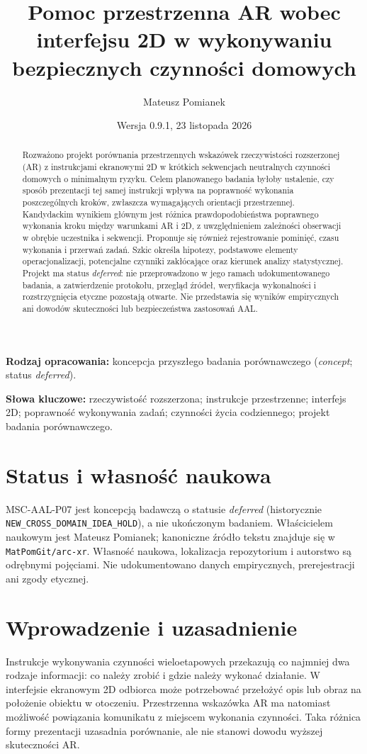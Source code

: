 \documentclass[11pt,a4paper]{article}
\title{Pomoc przestrzenna AR wobec interfejsu 2D w wykonywaniu bezpiecznych czynności domowych}
\author{Mateusz Pomianek}
\date{Wersja 0.9.1, 23 listopada 2026}
\begin{document}
\maketitle

\noindent\textbf{Rodzaj opracowania:} koncepcja przyszłego badania porównawczego (\textit{concept}; status \textit{deferred}).

\begin{abstract}
Rozważono projekt porównania przestrzennych wskazówek rzeczywistości rozszerzonej (AR) z instrukcjami ekranowymi 2D w krótkich sekwencjach neutralnych czynności domowych o minimalnym ryzyku. Celem planowanego badania byłoby ustalenie, czy sposób prezentacji tej samej instrukcji wpływa na poprawność wykonania poszczególnych kroków, zwłaszcza wymagających orientacji przestrzennej. Kandydackim wynikiem głównym jest różnica prawdopodobieństwa poprawnego wykonania kroku między warunkami AR i 2D, z uwzględnieniem zależności obserwacji w obrębie uczestnika i sekwencji. Proponuje się również rejestrowanie pominięć, czasu wykonania i przerwań zadań. Szkic określa hipotezy, podstawowe elementy operacjonalizacji, potencjalne czynniki zakłócające oraz kierunek analizy statystycznej. Projekt ma status \textit{deferred}: nie przeprowadzono w jego ramach udokumentowanego badania, a zatwierdzenie protokołu, przegląd źródeł, weryfikacja wykonalności i rozstrzygnięcia etyczne pozostają otwarte. Nie przedstawia się wyników empirycznych ani dowodów skuteczności lub bezpieczeństwa zastosowań AAL.
\end{abstract}

\noindent\textbf{Słowa kluczowe:} rzeczywistość rozszerzona; instrukcje przestrzenne; interfejs 2D; poprawność wykonywania zadań; czynności życia codziennego; projekt badania porównawczego.

\section{Status i własność naukowa}
MSC-AAL-P07 jest koncepcją badawczą o statusie \textit{deferred} (historycznie \texttt{NEW\_CROSS\_DOMAIN\_IDEA\_HOLD}), a nie ukończonym badaniem. Właścicielem naukowym jest Mateusz Pomianek; kanoniczne źródło tekstu znajduje się w \texttt{MatPomGit/arc-xr}. Własność naukowa, lokalizacja repozytorium i autorstwo są odrębnymi pojęciami. Nie udokumentowano danych empirycznych, prerejestracji ani zgody etycznej.

\section{Wprowadzenie i uzasadnienie}
Instrukcje wykonywania czynności wieloetapowych przekazują co najmniej dwa rodzaje informacji: co należy zrobić i gdzie należy wykonać działanie. W interfejsie ekranowym 2D odbiorca może potrzebować przełożyć opis lub obraz na położenie obiektu w otoczeniu. Przestrzenna wskazówka AR ma natomiast możliwość powiązania komunikatu z miejscem wykonania czynności. Taka różnica formy prezentacji uzasadnia porównanie, ale nie stanowi dowodu wyższej skuteczności AR.
\end{document}
